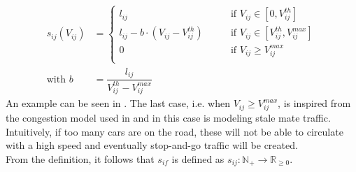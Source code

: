 \begin{equation}
	\begin{aligned}	
		s_{ij}(V_{ij}) &= \begin{cases}
			l_{ij} \quad\quad &\text{if } V_{ij}\in[0,V_{ij}^{th}]\\ 
			l_{ij} - b\cdot(V_{ij} - V_{ij}^{th}) \quad\quad &\text{if }V_{ij}\in[V_{ij}^{th}, V_{ij}^{max}]\\ 
			0\quad\quad &\text{if }V_{ij} \ge V_{ij}^{max}\\ 
		\end{cases}\\
		\text{with } b  &=  \dfrac{l_{ij}}{ V_{ij}^{th} -  V_{ij}^{max}}
\end{aligned}
	\label{eq:model_bpr_approximation2}
\end{equation}
An example can be seen in . The last case, i.e. when $V_{ij} \ge V_{ij}^{max}$, is inspired from the congestion model used in  and in this case is modeling stale mate traffic. Intuitively, if too many cars are on the road, these will not be able to circulate with a high speed and eventually stop-and-go traffic will be created. \\
From the definition, it follows that $s_{if}$ is defined as $s_{ij}: \mathbb{N}_{+} \rightarrow \mathbb{R}_{\ge 0}$.


